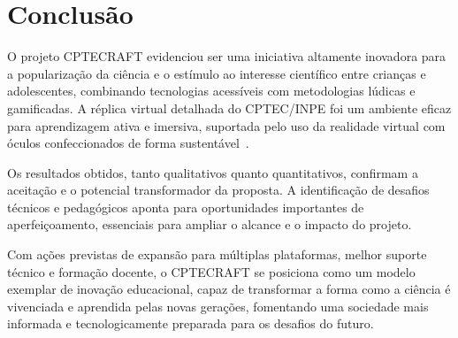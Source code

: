 
\chapter{Conclusão}

O projeto CPTECRAFT evidenciou ser uma iniciativa altamente inovadora para a popularização da ciência e o estímulo ao interesse científico entre crianças e adolescentes, combinando tecnologias acessíveis com metodologias lúdicas e gamificadas. A réplica virtual detalhada do CPTEC/INPE foi um ambiente eficaz para aprendizagem ativa e imersiva, suportada pelo uso da realidade virtual com óculos confeccionados de forma sustentável~.

Os resultados obtidos, tanto qualitativos quanto quantitativos, confirmam a aceitação e o potencial transformador da proposta. A identificação de desafios técnicos e pedagógicos aponta para oportunidades importantes de aperfeiçoamento, essenciais para ampliar o alcance e o impacto do projeto.

Com ações previstas de expansão para múltiplas plataformas, melhor suporte técnico e formação docente, o CPTECRAFT se posiciona como um modelo exemplar de inovação educacional, capaz de transformar a forma como a ciência é vivenciada e aprendida pelas novas gerações, fomentando uma sociedade mais informada e tecnologicamente preparada para os desafios do futuro.
\newpage